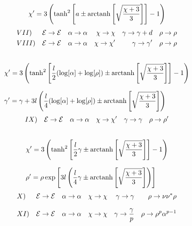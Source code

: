 \begin{equation}
    \chi' = 3\left(\tanh^2\left[a \pm \operatorname{arctanh} \left[ \sqrt{\frac{\chi + 3}{3}}\right]\right] - 1\right) \notag
\end{equation}
\begin{align}
  &VII) & \mathcal{E} &\rightarrow \mathcal{E} & \alpha &\rightarrow \alpha & \chi \rightarrow \chi  &&  \gamma \rightarrow \gamma + d && \rho \rightarrow \rho \notag\\
   &VIII) & \mathcal{E} &\rightarrow \mathcal{E} & \alpha &\rightarrow \alpha & \chi \rightarrow \chi'  &&  \gamma \rightarrow \gamma' && \rho \rightarrow \rho \notag\\\notag
\end{align}
\begin{align}
        &\chi' = 3\left(\tanh^2\left[\frac{l}{2}(\log[\alpha]+ \log[\rho]) \pm \operatorname{arctanh} \left[ \sqrt{\frac{\chi + 3}{3}}\right]\right] - 1\right) \notag\\[0.7em]
        &\gamma' = \gamma + 3l\left(\frac{l}{4}(\log[\alpha]+ \log[\rho]) \pm \operatorname{arctanh} \left[ \sqrt{\frac{\chi + 3}{3}}\right]\right)\notag
\end{align}
\begin{align}
  &IX) & \mathcal{E} &\rightarrow \mathcal{E} & \alpha &\rightarrow \alpha & \chi \rightarrow \chi'  &&  \gamma \rightarrow \gamma && \rho \rightarrow \rho' \notag\\ \notag
\end{align}
\begin{align}
        &\chi' = 3\left(\tanh^2\left[\frac{l}{2}\gamma \pm \operatorname{arctanh} \left[ \sqrt{\frac{\chi + 3}{3}}\right]\right] - 1\right) \notag\\[0.7em]
        &\rho' = \rho\exp\left[3l\left(\frac{l}{4}\gamma \pm \operatorname{arctanh} \left[ \sqrt{\frac{\chi + 3}{3}}\right]\right)\notag \right] 
\end{align}
\begin{align}
        &X) & \mathcal{E} &\rightarrow \mathcal{E} & \alpha &\rightarrow \alpha & \chi \rightarrow \chi  &&  \gamma \rightarrow \gamma && \rho \rightarrow \nu\nu^*\rho \notag\\[0.7em]
        &XI) & \mathcal{E} &\rightarrow \mathcal{E} & \alpha &\rightarrow \alpha & \chi \rightarrow \chi  &&  \gamma \rightarrow \frac{\gamma }{p}&& \rho \rightarrow \rho^{p}\alpha^{p-1} \notag\\ \notag
\end{align}
